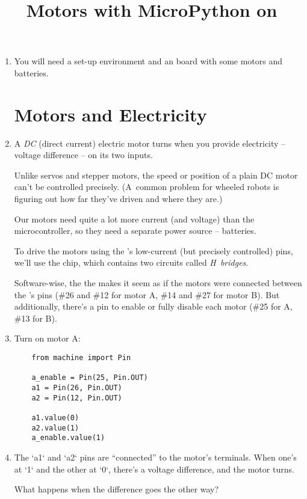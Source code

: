 \documentclass{../tutorial}
\title{Motors with MicroPython on \abbr{ESP32}}
\begin{document}
\begin{enumerate}

\item
    You will need a set-up environment and an  board
    with some motors and batteries.

\section{Motors and Electricity}

\item
    A \emph{DC} (direct current) electric motor turns when you provide
    electricity – voltage difference – on its two inputs.

    Unlike servos and stepper motors, the speed or position of a plain DC
    motor can't be controlled precisely.
    (A~common problem for wheeled robots is figuring out how far they've driven
    and where they are.)

    Our motors need quite a lot more current (and voltage) than the 
    microcontroller, so they need a separate power source – batteries.

    To drive the motors using the 's low-current (but precisely
    controlled) pins, we'll use the  chip, which contains two
    circuits called \emph{H~bridges}.

    Software-wise, the the  makes it seem as if the motors
    were connected between the 's pins (\#26 and \#12 for motor A,
    \#14 and \#27 for motor B).
    But additionally, there's a pin to enable or fully disable each motor
    (\#25 for A, \#13 for B).

\item
    Turn on motor A:

    \begin{lstlisting}
    from machine import Pin

    a_enable = Pin(25, Pin.OUT)
    a1 = Pin(26, Pin.OUT)
    a2 = Pin(12, Pin.OUT)

    a1.value(0)
    a2.value(1)
    a_enable.value(1)
    \end{lstlisting}

\item
    The `a1` and `a2` pins are “connected” to the motor's terminals.
    When one's at `1` and the other at `0`, there's a voltage difference,
    and the motor turns.

    What happens when the difference goes the other way?


\end{enumerate}
\end{document}
